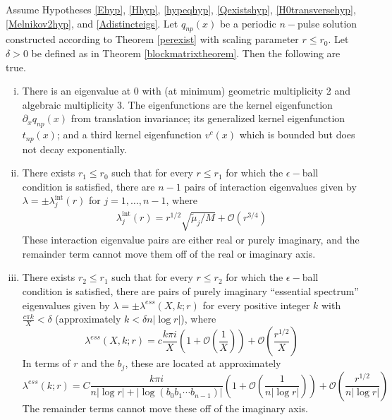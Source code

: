 \documentclass[thesis.tex]{subfiles}
\begin{document}
\begin{theorem}\label{locateeigtheorem}
Assume Hypotheses \ref{Ehyp}, \ref{Hhyp}, \ref{hypeqhyp}, \ref{Qexistshyp}, \ref{H0transversehyp}, \ref{Melnikov2hyp}, and \ref{Adistincteigs}. Let $q_{np}(x)$ be a periodic $n-$pulse solution constructed according to Theorem \ref{perexist} with scaling parameter $r \leq r_0$. Let $\delta > 0$ be defined as in Theorem \ref{blockmatrixtheorem}. Then the following are true.

\begin{enumerate}[(i)]

\item There is an eigenvalue at 0 with (at minimum) geometric multiplicity 2 and algebraic multiplicity 3. The eigenfunctions are the kernel eigenfunction $\partial_x q_{np}(x)$ from translation invariance; its generalized kernel eigenfunction $t_{np}(x)$; and a third kernel eigenfunction $v^c(x)$ which is bounded but does not decay exponentially.

\item There exists $r_1 \leq r_0$ such that for every $r \leq r_1$ for which the $\epsilon-$ball condition is satisfied, there are $n - 1$ pairs of interaction eigenvalues given by $\lambda = \pm \lambda^{\text{int}}_j(r)$ for $j = 1, \dots, n-1$, where
\begin{align*}
\lambda^{\text{int}}_j(r) = r^{1/2} \sqrt{\tilde{\mu}_j / M} + \mathcal{O}(r^{3/4})
\end{align*}
These interaction eigenvalue pairs are either real or purely imaginary, and the remainder term cannot move them off of the real or imaginary axis.

\item There exists $r_2 \leq r_1$ such that for every $r \leq r_2$ for which the $\epsilon-$ball condition is satisfied, there are pairs of purely imaginary ``essential spectrum'' eigenvalues given by $\lambda = \pm \lambda^{ess}(X,k; r)$ for every positive integer $k$ with $\frac{c \pi k}{X} < \delta$ (approximately $k < \delta n |\log r|$), where
\begin{equation}\label{lambdaess}
\lambda^{ess}(X, k; r) = c \frac{k \pi i }{X} \left( 1 + \mathcal{O}\left( \frac{1}{X} \right)\right) + \mathcal{O}\left( \frac{r^{1/2}}{X} \right)
\end{equation}
In terms of $r$ and the $b_j$, these are located at approximately
\begin{equation}\label{lambdaessr}
\lambda^{ess}(k; r) = C \frac{k \pi i }{n |\log r| + |\log (b_0 b_1 \cdots b_{n-1})|}  \left( 1 + \mathcal{O}\left( \frac{1}{n |\log r|} \right)\right) + \mathcal{O}\left( \frac{r^{1/2}}{n |\log r|} \right)
\end{equation}
The remainder terms cannot move these off of the imaginary axis.


\end{enumerate}
\end{theorem}
\end{document}
